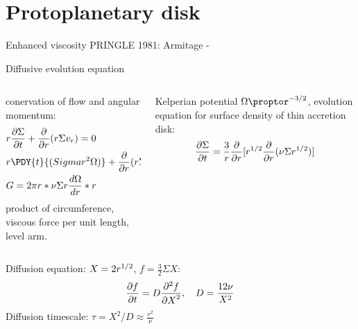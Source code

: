 \section{Protoplanetary disk}

\begin{wordonframe}{Enhanced viscosity}
PRINGLE 1981:
Armitage - 
\end{wordonframe}

\begin{frame}{Diffusive evolution equation}
\begin{columns}[T]\begin{column}{0.5\textwidth}
conervation of flow and angular momentum:
\begin{align*}
&r\PDy{t}{\Sigma}+\PDof{r}(r\Sigma v_r)=0\\
&r\PDY{t}{(Sigma r^2\Omega)}+\PDof{r}(r\Sigma v_r*r^2\Omega)=\frac{1}{2\pi}\PDy{r}{G}\\
&G=2\pi r*\nu\Sigma r\TDy{r}{\Omega}*r
\end{align*}
product of circumference, viscous force per unit length, level arm.
\end{column}\begin{column}{0.5\textwidth}
Kelperian potential $\Omega\proptor\expy{-3/2}$, evolution equation for  surface density of thin accretion disk:
\[\PDy{t}{\Sigma}=\frac{3}{r}\PDof{r}[r\expy{1/2}\PDof{r}(\nu\Sigma r\expy{1/2})]\]
\end{column}\end{columns}
Diffusion equation: $X=2r\expy{1/2}$, $f=\frac{3}{2}\Sigma X$:
\[\PDy{t}{f}=D\PtwoDy{X}{f},\quad D=\frac{12\nu}{X^2}\]
Diffusion timescale: $\tau=X^2/D\approx\frac{r^2}{\nu}$
\end{frame}